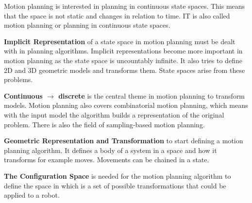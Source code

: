Motion planning is interested in planning in continuous state spaces. This means that the space is not static and changes in relation to time. IT is also called motion planning or planning in continuous state spaces. \cite{planning_algorithms_steven_m_lavalle}

\textbf{Implicit Representation} of a state space in motion planning must be dealt with in planning algorithms. Implicit representations become more important in motion planning as the state space is uncountably infinite. It also tries to define 2D and 3D geometric models and transforms them. State spaces arise from these problems. \cite{planning_algorithms_steven_m_lavalle}

\textbf{Continuous $\rightarrow$ discrete} is the central theme in motion planning to transform models. Motion planning also covers combinatorial motion planning, which means with the input model the algorithm builds a representation of the original problem. There is also the field of sampling-based motion planning. \cite{planning_algorithms_steven_m_lavalle}

\textbf{Geometric Representation and Transformation} to start defining a motion planning algorithm. It defines a body of a system in a space and how it transforms for example moves. Movements can be chained in a state. \cite{planning_algorithms_steven_m_lavalle}

\textbf{The Configuration Space} is needed for the motion planning algorithm to define the space in which is a set of possible transformations that could be applied to a robot. \cite{planning_algorithms_steven_m_lavalle}

